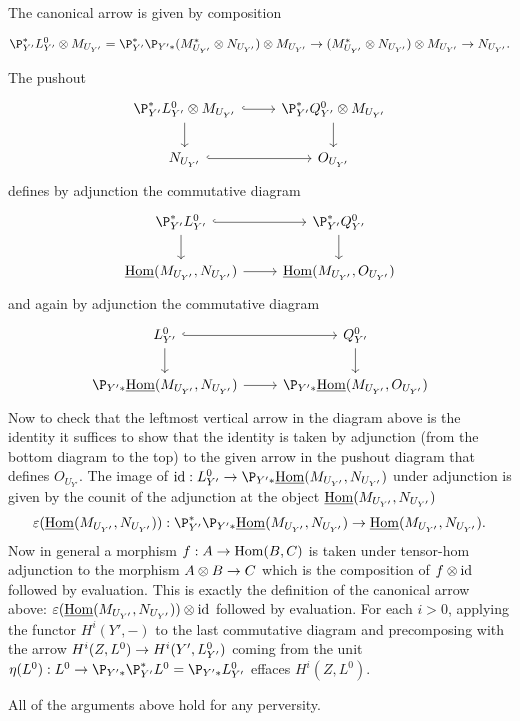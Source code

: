 \documentclass[deligne.tex]{subfiles}
\begin{document}
The canonical arrow is given by composition
\begin{ceqn}\begin{equation*}
	\P^*_{Y'}L^0_{Y'}\otimes M_{U_{Y'}}
	=\P^*_{Y'}\P_{Y'*}(M_{U_{Y'}}^*\otimes N_{U_{Y'}})\otimes M_{U_{Y'}}
	\ra (M_{U_{Y'}}^*\otimes N_{U_{Y'}})\otimes M_{U_{Y'}}
	\ra N_{U_{Y'}}.
\end{equation*}\end{ceqn}
The pushout
\begin{equation*}\begin{tikzcd}
	\P^*_{Y'}L_{Y'}^0\otimes M_{U_{Y'}}\arrow[r,hook]\arrow[d]
	&\P^*_{Y'}Q_{Y'}^0\otimes M_{U_{Y'}}\arrow[d] \\
	N_{U_{Y'}}\arrow[r,hook]&O_{U_{Y'}}
\end{tikzcd}\end{equation*}
defines by adjunction the commutative diagram
\begin{equation*}\begin{tikzcd}
	\P^*_{Y'}L_{Y'}^0\arrow[r,hook]\arrow[d]
	&\P^*_{Y'}Q_{Y'}^0\arrow[d] \\
	\underline\Hom(M_{U_{Y'}},N_{U_{Y'}})\arrow[r]
	&\underline\Hom(M_{U_{Y'}},O_{U_{Y'}})
\end{tikzcd}\end{equation*}
and again by adjunction the commutative diagram
\begin{equation*}\begin{tikzcd}
	L_{Y'}^0\arrow[r,hook]\arrow[d]
	&Q_{Y'}^0\arrow[d] \\
	\P_{Y'*}\underline\Hom(M_{U_{Y'}},N_{U_{Y'}})\arrow[r]
	&\P_{Y'*}\underline\Hom(M_{U_{Y'}},O_{U_{Y'}})
\end{tikzcd}\end{equation*}
Now to check that the leftmost vertical arrow in the diagram above is the
identity it suffices to show that the identity is taken by adjunction
(from the bottom diagram to the top) to the given arrow in
the pushout diagram that defines $O_{U_{Y'}}$.
The image of $\id:L_{Y'}^0\ra\P_{Y'*}\underline\Hom(M_{U_{Y'}},N_{U_{Y'}})$
under adjunction is given by the counit of the adjunction at the object
$\underline{\operatorname{Hom}}(M_{U_{Y'}},N_{U_{Y'}})$
\begin{equation*}
	\vep(\underline\Hom(M_{U_{Y'}},N_{U_{Y'}})):
	\P^*_{Y'}\P_{Y'*} \underline\Hom(M_{U_{Y'}},N_{U_{Y'}})
	\ra\underline\Hom(M_{U_{Y'}},N_{U_{Y'}}).
\end{equation*}
Now in general a morphism $f:A\rightarrow\operatorname{Hom}(B,C)$ is taken under tensor-hom 
adjunction to the morphism $A\otimes B\rightarrow C$ which is the composition of
$f\otimes\operatorname{id}$ followed by evaluation. This is exactly the definition of
the canonical arrow above:
$\varepsilon(\underline{\operatorname{Hom}}(M_{U_{Y'}},N_{U_{Y'}}))\otimes\operatorname{id}$ followed by
evaluation.
For each $i>0$, applying the functor $H^i(Y',-)$ to the last commutative
diagram and precomposing with the arrow
$H^i(Z,L^0)\rightarrow H^i(Y',L^0_{Y'})$ coming from the unit
$\eta(L^0):L^0\ra\P_{Y'*}\P^*_{Y'}L^0=\P_{Y'*}L^0_{Y'}$
effaces $H^i(Z,L^0)$.
\begin{perv}
	All of the arguments above hold for any perversity.
\end{perv}
\end{document}

